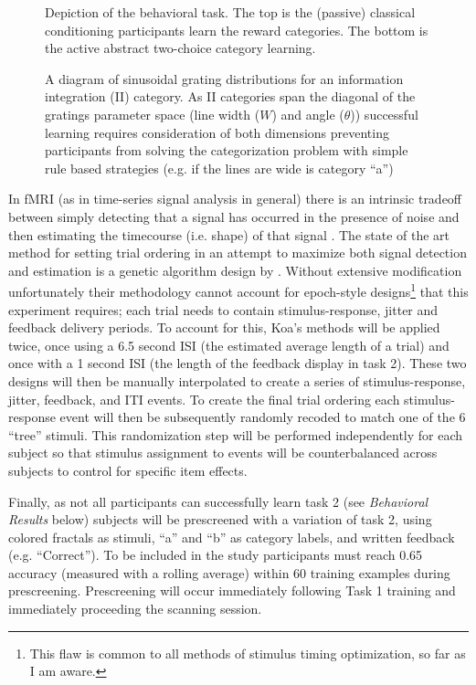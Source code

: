 \documentclass[doc,12pt]{apa}        %
\begin{document}
\begin{figure}[tp]
	\label{fig:task}
	\caption{Depiction of the behavioral task. The top is the (passive) classical conditioning participants learn the reward categories.  The bottom is the active abstract two-choice category learning.}
\end{figure}

\begin{figure}[tp]
	\label{fig:II}
	\caption{A diagram of sinusoidal grating distributions for an information integration (II) category.  As II categories span the diagonal of the gratings parameter space (line width ($W$) and angle ($\theta$)) successful learning requires consideration of both dimensions preventing participants from solving the categorization problem with simple rule based strategies (e.g. if the lines are wide is category ``a'')}
\end{figure}

In fMRI (as in time-series signal analysis in general) there is an intrinsic tradeoff between simply detecting that a signal has occurred in the presence of noise and then estimating the timecourse (i.e. shape) of that signal \cite{Dale:1999p7901,Birn:2002p1777,Liu:2004p2141}.   The state of the art method for setting trial ordering in an attempt to maximize both signal detection and estimation is a genetic algorithm design by .  Without extensive modification unfortunately their methodology cannot account for epoch-style designs\footnote{This flaw is common to all methods of stimulus timing optimization, so far as I am aware.} that this experiment requires; each trial needs to contain stimulus-response, jitter and feedback delivery periods.  To account for this, Koa's methods will be applied twice, once using a 6.5 second ISI (the estimated average length of a trial) and once with a 1 second ISI (the length of the feedback display in task 2).  These two designs will then be manually interpolated to create a series of stimulus-response, jitter, feedback, and ITI events.  To create the final trial ordering each stimulus-response event will then be subsequently randomly recoded to match one of the 6 ``tree'' stimuli.  This randomization step will be performed independently for each subject so that stimulus assignment to events will be counterbalanced across subjects to control for specific item effects.  

Finally, as not all participants can successfully learn task 2 (see \emph{Behavioral Results} below) subjects will be prescreened with a variation of task 2, using colored fractals as stimuli, ``a'' and ``b'' as category labels, and written feedback (e.g. ``Correct'').  To be included in the study participants must reach 0.65 accuracy (measured with a rolling average) within 60 training examples during prescreening.  Prescreening will occur immediately following Task 1 training and immediately proceeding the scanning session.
\end{document}
